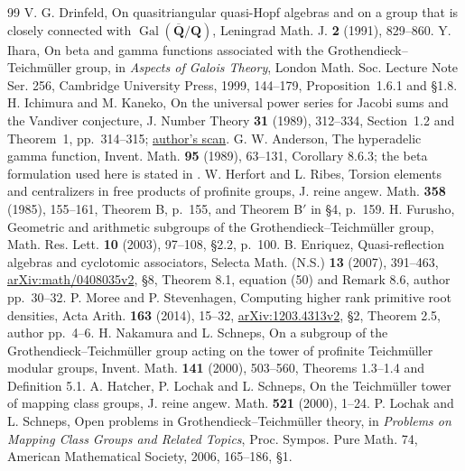 \documentclass[11pt,a4paper]{article}
\theoremstyle{definition}
\theoremstyle{remark}
\newcommand{\Q}{\mathbf Q}
\begin{document}
\begin{thebibliography}{99}
 V. G. Drinfeld, On quasitriangular quasi-Hopf algebras and on a group that is closely connected with $\operatorname{Gal}(\overline{\Q}/\Q)$, Leningrad Math. J. \textbf{2} (1991), 829--860.
 Y. Ihara, On beta and gamma functions associated with the Grothendieck--Teichm\"uller group, in \emph{Aspects of Galois Theory}, London Math. Soc. Lecture Note Ser. 256, Cambridge University Press, 1999, 144--179, Proposition~1.6.1 and \S1.8.
 H. Ichimura and M. Kaneko, On the universal power series for Jacobi sums and the Vandiver conjecture, J. Number Theory \textbf{31} (1989), 312--334, Section~1.2 and Theorem~1, pp.~314--315; \href{https://www2.math.kyushu-u.ac.jp/~mkaneko/papers/04universal_power.pdf}{author's scan}.
 G. W. Anderson, The hyperadelic gamma function, Invent. Math. \textbf{95} (1989), 63--131, Corollary 8.6.3; the beta formulation used here is stated in \cite[Remark 2.4, p.~101]{Furusho2003}.
 W. Herfort and L. Ribes, Torsion elements and centralizers in free products of profinite groups, J. reine angew. Math. \textbf{358} (1985), 155--161, Theorem B, p.~155, and Theorem B$'$ in \S4, p.~159.
 H. Furusho, Geometric and arithmetic subgroups of the Grothendieck--Teichm\"uller group, Math. Res. Lett. \textbf{10} (2003), 97--108, \S2.2, p.~100.
 B. Enriquez, Quasi-reflection algebras and cyclotomic associators, Selecta Math. (N.S.) \textbf{13} (2007), 391--463, \href{https://arxiv.org/abs/math/0408035v2}{arXiv:math/0408035v2}, \S8, Theorem 8.1, equation (50) and Remark 8.6, author pp.~30--32.
 P. Moree and P. Stevenhagen, Computing higher rank primitive root densities, Acta Arith. \textbf{163} (2014), 15--32, \href{https://arxiv.org/abs/1203.4313v2}{arXiv:1203.4313v2}, \S2, Theorem 2.5, author pp.~4--6.
 H. Nakamura and L. Schneps, On a subgroup of the Grothendieck--Teichm\"uller group acting on the tower of profinite Teichm\"uller modular groups, Invent. Math. \textbf{141} (2000), 503--560, Theorems 1.3--1.4 and Definition 5.1.
 A. Hatcher, P. Lochak and L. Schneps, On the Teichm\"uller tower of mapping class groups, J. reine angew. Math. \textbf{521} (2000), 1--24.
 P. Lochak and L. Schneps, Open problems in Grothendieck--Teichm\"uller theory, in \emph{Problems on Mapping Class Groups and Related Topics}, Proc. Sympos. Pure Math. 74, American Mathematical Society, 2006, 165--186, \S1.

\end{thebibliography}
\end{document}
